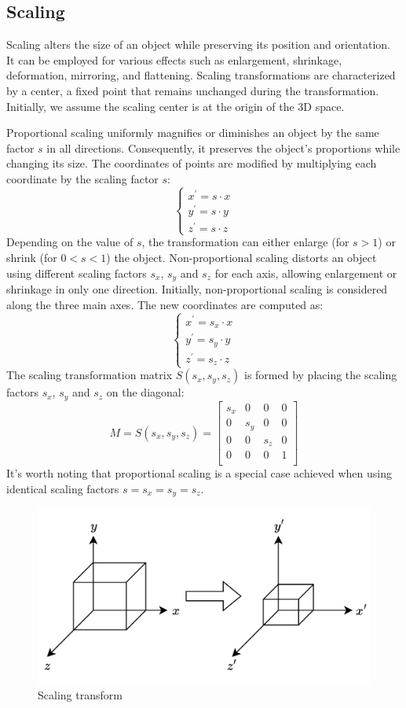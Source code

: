 \subsection{Scaling}
Scaling alters the size of an object while preserving its position and orientation. 
It can be employed for various effects such as enlargement, shrinkage, deformation, mirroring, and flattening. 
Scaling transformations are characterized by a center, a fixed point that remains unchanged during the transformation. 
Initially, we assume the scaling center is at the origin of the 3D space.

Proportional scaling uniformly magnifies or diminishes an object by the same factor $s$ in all directions. 
Consequently, it preserves the object's proportions while changing its size. 
The coordinates of points are modified by multiplying each coordinate by the scaling factor $s$:
\[\begin{cases}
    x^\prime=s \cdot x \\ 
    y^\prime=s \cdot y \\ 
    z^\prime=s \cdot z 
\end{cases}\]
Depending on the value of $s$, the transformation can either enlarge (for $s > 1$) or shrink (for $0 < s < 1$) the object.
Non-proportional scaling distorts an object using different scaling factors $s_x$, $s_y$ and $s_z$ for each axis, allowing enlargement or shrinkage in only one direction.
Initially, non-proportional scaling is considered along the three main axes. 
The new coordinates are computed as:
\[\begin{cases}
    x^\prime=s_x \cdot x \\ 
    y^\prime=s_y \cdot y \\ 
    z^\prime=s_z \cdot z 
\end{cases}\]
The scaling transformation matrix $S(s_x , s_y , s_z)$ is formed by placing the scaling factors $s_x$, $s_y$ and $s_z$ on the diagonal:
\[M=S(s_x , s_y , s_z)=\begin{bmatrix}
    s_x & 0   & 0   & 0 \\
    0   & s_y & 0   & 0 \\
    0   & 0   & s_z & 0 \\
    0   & 0   & 0   & 1 \\
\end{bmatrix}\]
It's worth noting that proportional scaling is a special case achieved when using identical scaling factors $s=s_x=s_y=s_z$. 

\begin{figure}[H]
    \centering
    \includegraphics[width=0.65\linewidth]{images/scaling.png}
    \caption{Scaling transform}
\end{figure}

